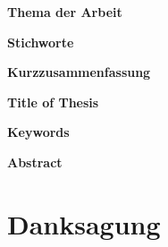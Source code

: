 %
%
\newpage
\thispagestyle{plain}
\clearpage
\hfuzz=12pt       %

\textbf{\IthesisAuthor}

\vspace{0.3cm}
\textbf{Thema der Arbeit}

\IthesisTitle

\vspace{0.3cm}
\textbf{Stichworte}

\IkeyWordsDE

\vspace{0.3cm}
\textbf{Kurzzusammenfassung}

\begin{minipage}{\textwidth}
\IabstractDE
\end{minipage}

\newpage
\thispagestyle{plain}
\clearpage
\hfuzz=12pt       %

\textbf{\IthesisAuthor}

\vspace{0.3cm}
\textbf{Title of Thesis}

\IthesisTitleEN

\vspace{0.3cm}
\textbf{Keywords}

\begin{minipage}{\textwidth}
\IkeyWordsEN
\end{minipage}

\vspace{0.3cm}
\textbf{Abstract}

\IabstractEN

\newpage
\thispagestyle{plain}
\clearpage
\hfuzz=12pt       %

\chapter*{Danksagung}

